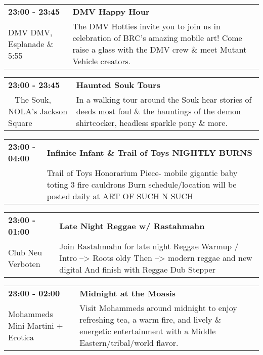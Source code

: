 \begin{tabular}{ p{1in} p{2.2in} }
    \textbf{23:00 - 23:45} & \textbf{DMV Happy Hour} \\
    DMV \newline DMV, Esplanade \& 5:55 & The DMV Hotties invite you to join us in celebration of BRC's amazing mobile art! Come raise a glass with the DMV crew \& meet Mutant Vehicle creators. \\
    \hline 
\end{tabular}
    
\begin{tabular}{ p{1in} p{2.2in} }
    \textbf{23:00 - 23:45} & \textbf{Haunted Souk Tours} \\
    ~ \newline The Souk, NOLA's Jackson Square & In a walking tour around the Souk hear stories of deeds most foul \& the hauntings of the demon shirtcocker, headless sparkle pony \& more. \\
    \hline 
\end{tabular}
    
\begin{tabular}{ p{1in} p{2.2in} }
    \textbf{23:00 - 04:00} & \textbf{Infinite Infant \& Trail of Toys NIGHTLY BURNS} \\
    ~ \newline  & Trail of Toys Honorarium Piece- mobile gigantic baby toting 3 fire cauldrons Burn schedule/location will be posted daily at ART OF SUCH N SUCH \\
    \hline 
\end{tabular}
    
\begin{tabular}{ p{1in} p{2.2in} }
    \textbf{23:00 - 01:00} & \textbf{  Late Night Reggae w/ Rastahmahn   } \\
    Club Neu Verboten \newline  & Join Rastahmahn for late night Reggae Warmup / Intro --> Roots oldy
Then --> modern reggae and new  digital
And finish with Reggae Dub Stepper \\
    \hline 
\end{tabular}
    
\begin{tabular}{ p{1in} p{2.2in} }
    \textbf{23:00 - 02:00} & \textbf{Midnight at the Moasis} \\
    Mohammeds Mini Martini + Erotica \newline  & Visit Mohammeds around midnight to enjoy refreshing tea, a warm fire, and lively \& energetic entertainment with a Middle Eastern/tribal/world flavor. \\
    \hline 
\end{tabular}
    
